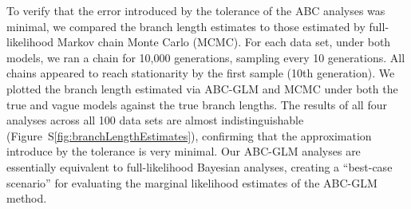 To verify that the error introduced by the tolerance of the ABC analyses was
minimal, we compared the branch length estimates to those estimated by
full-likelihood Markov chain Monte Carlo (MCMC).
For each data set, under both models, we ran a chain for 10,000 generations,
sampling every 10 generations.
All chains appeared to reach stationarity by the first sample (10th
generation).
We plotted the branch length estimated via ABC-GLM and MCMC under both
the true and vague models against the true branch lengths.
The results of all four analyses across all 100 data sets are almost
indistinguishable (Figure~S\ref{fig:branchLengthEstimates}), confirming that
the approximation introduce by the tolerance is very minimal.
Our ABC-GLM analyses are essentially equivalent to full-likelihood Bayesian
analyses, creating a ``best-case scenario'' for evaluating the marginal
likelihood estimates of the ABC-GLM method.
